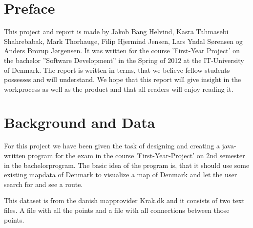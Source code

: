 \documentclass[a4paper,10pt,titlepage]{article}
\begin{document}
\thispagestyle{empty}
	
	\tableofcontents

	\newpage
	\section{Preface}
		This project and report is made by Jakob Bang Helvind, Kasra Tahmasebi Shahrebabak, Mark Thorhauge, Filip Hjermind Jensen, Lars Yndal S\o rensen og
		Anders Brorup J\o rgensen. It was written for the course ’First-Year Project’ on the bachelor ”Software Development” in the Spring of 2012 at the
		IT-University of Denmark. The report is written in terms, that we believe fellow students possesses and will understand. We hope that this 
		report will give insight in the workprocess as well as the product and that all readers will enjoy reading it.
		
	\newpage
	\section{Background and Data}
	
		For this project we have been given the task of designing and creating a java-written program 
		for the exam in the course 'First-Year-Project' on 2nd semester in the bachelorprogram. The basic idea of the 
		program is, that it should use some existing mapdata of Denmark to visualize a map of Denmark and let the user search for and see a route. 

		This dataset is from the danish mapprovider Krak.dk and it consists of two text files. A file with all the points 
		and a file with all connections between those points.\\
 
\end{document}
